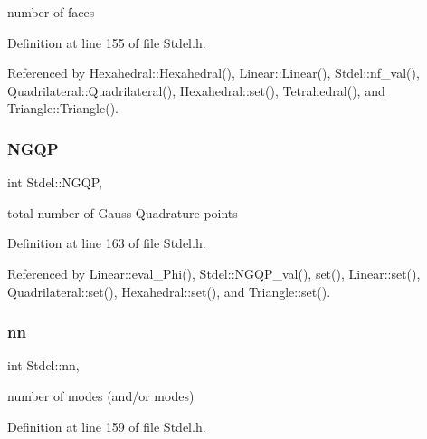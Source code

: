 number of faces 



Definition at line 155 of file Stdel.\+h.



Referenced by Hexahedral\+::\+Hexahedral(), Linear\+::\+Linear(), Stdel\+::nf\+\_\+val(), Quadrilateral\+::\+Quadrilateral(), Hexahedral\+::set(), Tetrahedral(), and Triangle\+::\+Triangle().

\mbox{\label{classStdel_aa3cff31280606cd3eb95af770dd6f5b4}} 
\subsubsection{\texorpdfstring{N\+G\+QP}{NGQP}}
{\footnotesize\ttfamily int Stdel\+::\+N\+G\+QP\hspace{0.3cm}{\ttfamily [protected]}, {\ttfamily [inherited]}}



total number of Gauss Quadrature points 



Definition at line 163 of file Stdel.\+h.



Referenced by Linear\+::eval\+\_\+\+Phi(), Stdel\+::\+N\+G\+Q\+P\+\_\+val(), set(), Linear\+::set(), Quadrilateral\+::set(), Hexahedral\+::set(), and Triangle\+::set().

\mbox{\label{classStdel_af4d02765d362e2f0469633ff78734f89}} 
\subsubsection{\texorpdfstring{nn}{nn}}
{\footnotesize\ttfamily int Stdel\+::nn\hspace{0.3cm}{\ttfamily [protected]}, {\ttfamily [inherited]}}



number of modes (and/or modes) 



Definition at line 159 of file Stdel.\+h.



